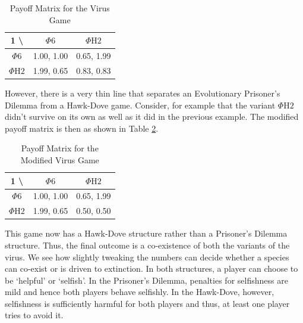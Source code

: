 \documentclass{article}
\theoremstyle{definition}
\begin{document}
\begin{table}[H]
    \begin{adjustbox}{center}
    \begin{tabular}{|c|c|c|}
        \hline
         1 \textbackslash \; 2& $\Phi6$ & $\Phi \text{H} 2$ \\
        \hline
        $\Phi6$ & 1.00, 1.00 & 0.65, 1.99\\
        \hline 
        $\Phi \text{H} 2$ & 1.99, 0.65 & 0.83, 0.83  \\
        \hline
    \end{tabular}
    \end{adjustbox}
    \caption{Payoff Matrix for the Virus Game}
    \label{table:virus1}
\end{table}

However, there is a very thin line that separates an Evolutionary Prisoner's Dilemma from a Hawk-Dove game. Consider, for example that the variant $\Phi \text{H} 2$ didn't survive on its own as well as it did in the previous example. The modified payoff matrix is then as shown in Table \ref{table:virus2}.

\begin{table}[H]
    \begin{adjustbox}{center}
    \begin{tabular}{|c|c|c|}
        \hline
         1 \textbackslash \; 2& $\Phi6$ & $\Phi \text{H} 2$ \\
        \hline
        $\Phi6$ & 1.00, 1.00 & 0.65, 1.99\\
        \hline 
        $\Phi \text{H} 2$ & 1.99, 0.65 & 0.50, 0.50  \\
        \hline
    \end{tabular}
    \end{adjustbox}
    \caption{Payoff Matrix for the Modified Virus Game}
    \label{table:virus2}
\end{table}

This game now has a Hawk-Dove structure rather than a Prisoner's Dilemma structure. Thus, the final outcome is a co-existence of both the variants of the virus. We see how slightly tweaking the numbers can decide whether a species can co-exist or is driven to extinction. In both structures, a player can choose to be `helpful' or `selfish'. In the Prisoner's Dilemma, penalties for selfishness are mild and hence both players behave selfishly. In the Hawk-Dove, however, selfishness is sufficiently harmful for both players and thus, at least one player tries to avoid it. 
\end{document}
